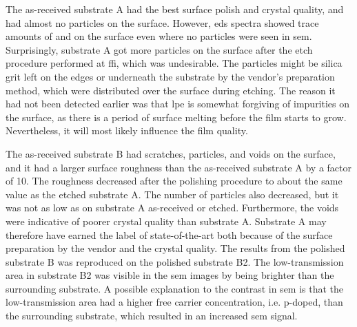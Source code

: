 The as-received substrate A had the best surface polish and crystal quality, and had almost no particles on the surface. However, \ac{eds} spectra showed trace amounts of  and  on the surface even where no particles were seen in \ac{sem}. Surprisingly, substrate A got more particles on the surface after the etch procedure performed at \ac{ffi}, which was undesirable. The particles might be silica grit left on the edges or underneath the substrate by the vendor's preparation method, which were distributed over the surface during etching. The reason it had not been detected earlier was that \ac{lpe} is somewhat forgiving of impurities on the surface, as there is a period of surface melting before the film starts to grow. Nevertheless, it will most likely influence the film quality.

%

The as-received substrate B had scratches, particles, and voids on the surface, and it had a larger surface roughness than the as-received substrate A by a factor of 10. The roughness decreased after the polishing procedure to about the same value as the etched substrate A. The number of particles also decreased, but it was not as low as on substrate A as-received or etched. Furthermore, the voids were indicative of poorer crystal quality than substrate A. Substrate A may therefore have earned the label of state-of-the-art both because of the surface preparation by the vendor and the crystal quality. The results from the polished substrate B was reproduced on the polished substrate B2. The low-transmission area in substrate B2 was visible in the \ac{sem} images by being brighter than the surrounding substrate. A possible explanation to the contrast in \ac{sem} is that the low-transmission area had a higher free carrier concentration, i.e. p-doped, than the surrounding substrate, which resulted in an increased \ac{sem} signal.

